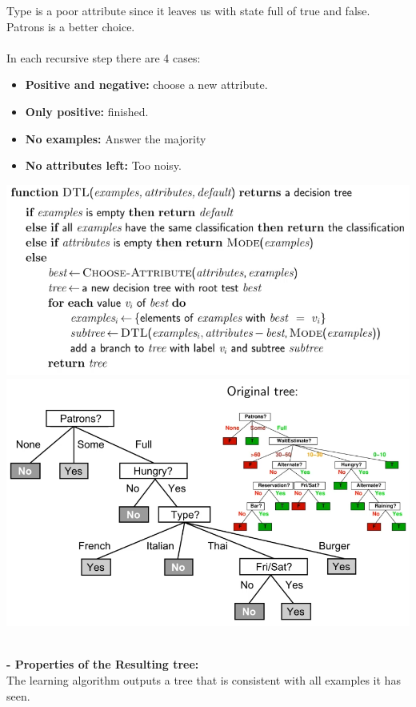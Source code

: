 \documentclass{article}
\begin{document}
\begin{itemize}
Type is a poor attribute since it leaves us with state full of true and false.\\
Patrons is a better choice.\\\\
In each recursive step there are 4 cases:\\
\begin{itemize}
\item \textbf{Positive and negative: }choose a new attribute.
\item \textbf{Only positive: }finished.
\item \textbf{No examples: }Answer the majority
\item \textbf{No attributes left: }Too noisy.
\end{itemize}
\includegraphics[scale=0.3]{88.png}
\includegraphics[scale=0.2]{89.png}\\\\
\end{itemize}
\textbf{- Properties of the Resulting tree:}\\
The learning algorithm outputs a tree that is consistent with all examples it has seen.\\
\end{document}

